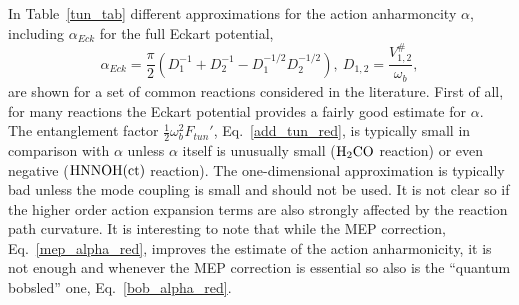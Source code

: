 \documentclass[journal=jpcafh,manuscript=article]{achemso}
\begin{document}
In Table~\ref{tun_tab} different approximations for the action
anharmoncity $\alpha$, including $\alpha_{Eck}$
for the full Eckart potential,
\begin{equation}
  \label{eck_alpha}
  \alpha_{Eck}=\frac{\pi}{2}(D_1^{-1}+D_2^{-1}-D_1^{-1/2}D_2^{-1/2}),\
  D_{1,2}=\frac{V^\#_{1,2}}{\omega_b},
\end{equation}
are shown for a set of common reactions considered in the literature.
First of all, for many reactions the Eckart potential provides a fairly
good estimate for $\alpha$. The entanglement factor
$\frac{1}{2}\omega_b^2F_{tun}'$, Eq.~\ref{add_tun_red}, is typically
small in comparison with $\alpha$ unless $\alpha$ itself is unusually
small ($\rm H_2CO$ reaction) or even negative ($\rm HNNOH(ct)$
reaction).  The one-dimensional approximation is typically bad unless the
mode coupling is small and should not be used. It is not clear so if
the higher order action expansion terms are also strongly affected by
the reaction path curvature. It is interesting to note that while the MEP
correction, Eq.~\ref{mep_alpha_red}, improves the estimate of the
action anharmonicity, it is not enough and whenever the MEP
correction is essential so also is the ``quantum bobsled'' one,
Eq.~\ref{bob_alpha_red}.
\end{document}
